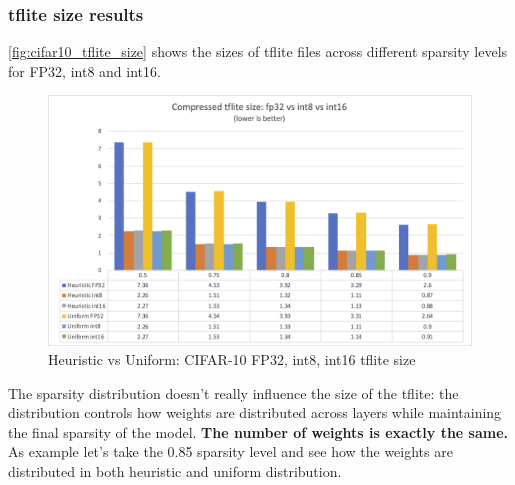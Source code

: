 \subsubsection{tflite size results}\label{subsub:tflite_size_results}
\autoref{fig:cifar10_tflite_size} shows the sizes of tflite files across
different sparsity levels for FP32, int8 and int16.

\begin{figure}[ht]
    \includegraphics[width=\linewidth]{images/experiments/cifar10_tflite_size.png}
    \centering
    \caption{Heuristic vs Uniform: CIFAR-10 FP32, int8, int16 tflite size}\label{fig:cifar10_tflite_size}
\end{figure}

The sparsity distribution doesn't really influence the size of the tflite:
the distribution controls how weights are distributed across layers while
maintaining the final sparsity of the model. \textbf{The number of weights is
exactly the same.}
As example let's take the 0.85 sparsity level and see how the weights are
distributed in both heuristic and uniform distribution.

